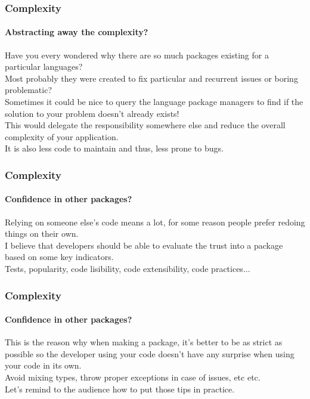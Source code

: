 \begin{frame}
    \frametitle{Complexity}
    \framesubtitle{Abstracting away the complexity?}

    Have you every wondered why there are so much packages existing for a
    particular languages?\\
    \pause
    Most probably they were created to fix particular and recurrent issues or
    boring problematic?\\
    \pause
    Sometimes it could be nice to query the language package managers to find if
    the solution to your problem doesn't already exists!\\
    \pause
    This would delegate the responsibility somewhere else and reduce the overall
    complexity of your application.\\
    \pause
    It is also less code to maintain and thus, less prone to bugs.
\end{frame}

\begin{frame}
    \frametitle{Complexity}
    \framesubtitle{Confidence in other packages?}

    Relying on someone else's code means a lot, for some reason people prefer
    redoing things on their own.\\
    \pause
    I believe that developers should be able to evaluate the trust into a
    package based on some key indicators.\\
    \pause
    Tests, popularity, code lisibility, code extensibility, code practices...
\end{frame}

\begin{frame}
    \frametitle{Complexity}
    \framesubtitle{Confidence in other packages?}

    This is the reason why when making a package, it's better to be as strict
    as possible so the developer using your code doesn't have any surprise when
    using your code in its own.\\
    \pause
    Avoid mixing types, throw proper exceptions in case of issues, etc etc.\\
    \pause
    Let's remind to the audience how to put those tips in practice.
\end{frame}
